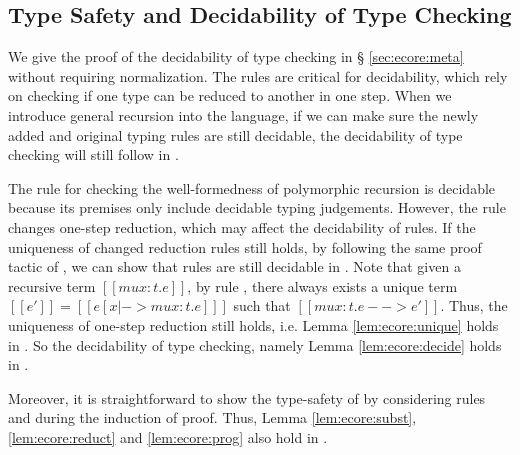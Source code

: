 \subsection{Type Safety and Decidability of Type Checking}
We give the proof of the decidability of type checking \ecore in \S
\ref{sec:ecore:meta} without requiring normalization. The \cast rules
are critical for decidability, which rely on checking if one type can
be reduced to another in one step. When we introduce general recursion
into the language, if we can make sure the newly added and original
typing rules are still decidable, the decidability of type checking
will still follow in \name.

The rule  for checking the well-formedness of
polymorphic recursion is decidable because its premises only include
decidable typing judgements. However, the rule  changes
one-step reduction, which may affect the decidability of \cast
rules. If the uniqueness of changed reduction rules still holds, by
following the same proof tactic of \ecore, we can show that \cast
rules are still decidable in \name. Note that given a recursive term
$[[mu x:t.e]]$, by rule , there always exists a unique
term $[[e']]=[[e[x|->mu x:t.e] ]]$ such that $[[mu x:t.e -->
    e']]$. Thus, the uniqueness of one-step reduction still holds,
i.e. Lemma \ref{lem:ecore:unique} holds in \name. So the decidability
of type checking, namely Lemma \ref{lem:ecore:decide} holds in \name.

Moreover, it is straightforward to show the type-safety of \name by
considering rules  and  during the
induction of proof. Thus, Lemma \ref{lem:ecore:subst},
\ref{lem:ecore:reduct} and \ref{lem:ecore:prog} also hold in \name.
